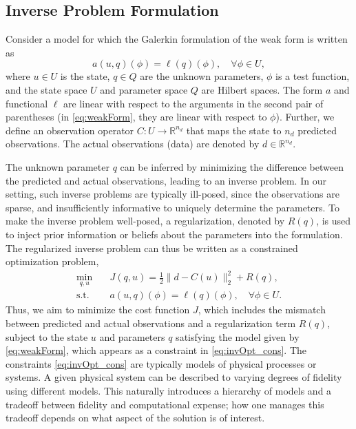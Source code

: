\documentclass[review]{siamart0516}
\newcommand{\R}{{\mathbb{R}}}
\newcommand{\Reals}{{\mathbb{R}}}
\begin{document}
\subsection{Inverse Problem Formulation}  \label{sec:setup}
%
Consider a model for which the Galerkin formulation of the weak form is written as
\begin{equation}
a(u,q)(\phi)=\ell(q)(\phi),\quad\forall\phi\in U,
\label{eq:weakForm}
\end{equation}
where $u\in U$ is the state, $q\in Q$ are the unknown parameters, $\phi$ is a test function, and the state space $U$ and parameter space $Q$ are Hilbert spaces. The form $a$ and functional $\ell$ are linear with respect to the arguments in the second pair of parentheses (in \cref{eq:weakForm}, they are linear with respect to $\phi$). Further, we define an observation operator $C:U\to\Reals^{n_d}$ that maps the state to $n_d$ predicted observations. The actual observations (data) are denoted by $d\in\R^{n_d}$.

The unknown parameter $q$ can be inferred by minimizing the difference between the predicted and actual observations, leading to an inverse problem. In our setting, such inverse problems are typically ill-posed, since the observations are sparse, and insufficiently informative to uniquely determine the parameters. To make the inverse problem well-posed, a regularization, denoted by $R(q)$, is used to inject prior information or beliefs about the parameters into the formulation. The regularized inverse problem can thus be written as a constrained optimization problem,
%
\begin{subequations}
\label{eq:invOpt}
\begin{align}
\min\limits_{q,u} & \quad J(q,u)=\frac{1}{2}\|d-C(u)\|_2^2 + R(q), \label{eq:invOpt_obj} \\
\textrm{s.t. }& \quad a(u,q)(\phi)=\ell(q)(\phi),\quad\forall\phi\in U. \label{eq:invOpt_cons}
\end{align}
\end{subequations}
%
Thus, we aim to minimize the cost function $J$, which includes the mismatch between predicted and actual observations and a regularization term $R(q)$, subject to the state $u$ and parameters $q$ satisfying the model given by \cref{eq:weakForm}, which appears as a constraint in \cref{eq:invOpt_cons}. The constraints \cref{eq:invOpt_cons} are typically models of physical processes or systems. A given physical system can be described to varying degrees of fidelity using different models. This naturally introduces a hierarchy of models and a tradeoff between fidelity and computational expense; how one manages this tradeoff depends on what aspect of the solution is of interest.
\end{document}
